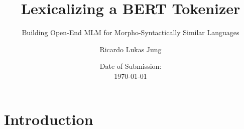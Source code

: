 \documentclass[english]{ttlab-qualify}
\begin{document}
\titlehead{
  Ricardo Lukas Jung\\
  6227492\\
  Bachelor\\
  Empirische Sprachwissenschaft / Phonetik \& Digital Humanities \\
   Semester\\
  s2458588@stud.uni-frankfurt.de
}
\subject{Bachelor Thesis}
\author{Ricardo Lukas Jung}
\title{Lexicalizing a BERT Tokenizer}
\subtitle{Building Open-End MLM for Morpho-Syntactically Similar Languages}
\date{Date of Submission: \\\today}
\publishers{Text Technology Lab\\Prof. Dr. Alexander Mehler\\Dr. Zakharia Pourtskhvanidze}

\maketitle


\tableofcontents

\chapter{Introduction}


\appendix
\printbibliography
\end{document}

